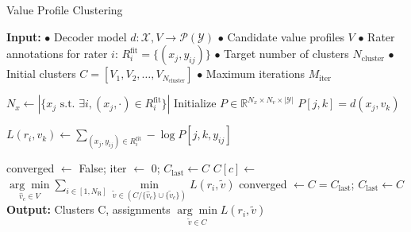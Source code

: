 \documentclass[11pt]{article}
\begin{document}
\begin{algorithm}[H]
\begin{algorithmic}
\caption{Value Profile Clustering}
\small
\label{alg:cluster}
\State \textbf{Input:}
\State $\bullet$
Decoder model $d : \mathcal{X},V \to \mathcal{P}(\mathcal{Y})$
\State $\bullet$
Candidate value profiles $V$%
\State $\bullet$
Rater annotations for rater $i$: $R_i^{\text{fit}} = \{(x_j, y_{ij})\}$
\State $\bullet$
Target number of clusters $N_\text{cluster}$
\State $\bullet$
Initial clusters $C = [V_1, V_2, \ldots, V_{N_\text{cluster}}]$
\State $\bullet$
Maximum iterations $M_\text{iter}$

\medskip
\State $N_x \gets |\{x_j \text{ s.t. } \exists i, (x_j,\cdot) \in R_i^{\text{fit}}\}|$ 
\State Initialize $P \in \mathbb{R}^{N_x \times N_v \times |\mathcal{Y}|}$ 
 
 
\State $P[j,k] = d(x_j, v_k)$ 
\EndFor
\EndFor

\medskip
\State $L(r_i, v_k) \gets \sum_{(x_j,y_{ij}) \in R_i^{\text{fit}}} -\log P[j,k,y_{ij}]$ 

\State converged $\gets$ False; iter $\gets$ 0; $C_\text{last} \gets C$
 
\State $C[c] \gets$ 
\State $\underset{\hat{v}_c \in V}{\arg\min} 
\underset{i \in [1, N_\text{R}]}{\sum}
\underset{\tilde{v} \in (C/\{\hat{v}_c\} \cup \{\tilde{v}_c\})}{\min}
L(r_i,\tilde{v})$
\EndFor
\State converged $\gets C = C_\text{last}$; $C_\text{last} \gets C$
\EndWhile
\State \textbf{Output:} Clusters C, assignments
$\underset{\tilde{v} \in C}{\arg\min}
L(r_i,\tilde{v})$

\end{algorithmic}
\end{algorithm}
\vspace{-5pt}
\end{document}
